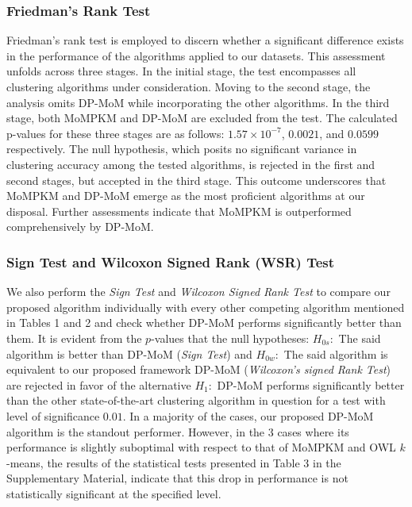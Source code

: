 \documentclass{article}
\begin{document}
\subsubsection{Friedman's Rank Test} 
Friedman's rank test \cite{friedman} is employed to discern whether a significant difference exists in the performance of the algorithms applied to our datasets. This assessment unfolds across three stages. In the initial stage, the test encompasses all clustering algorithms under consideration. Moving to the second stage, the analysis omits DP-MoM while incorporating the other algorithms. In the third stage, both MoMPKM and DP-MoM are excluded from the test. The calculated p-values for these three stages are as follows: $1.57 \times 10^{-7}$, $0.0021$, and $0.0599$ respectively. The null hypothesis, which posits no significant variance in clustering accuracy among the tested algorithms, is rejected in the first and second stages, but accepted in the third stage. This outcome underscores that MoMPKM and DP-MoM emerge as the most proficient algorithms at our disposal. Further assessments indicate that MoMPKM is outperformed comprehensively by DP-MoM. 

\subsubsection{Sign Test and Wilcoxon Signed Rank (WSR) Test}

We also perform the \textit{Sign Test} and \textit{Wilcoxon Signed Rank Test} to compare our proposed algorithm individually with every other competing algorithm mentioned in Tables 1 and 2 and check whether DP-MoM performs significantly better than them. It is evident from the $p$-values that the null hypotheses: $H_{0s}:$ The said algorithm is better than DP-MoM (\textit{Sign Test}) and $H_{0w}:$ The said algorithm is equivalent to our proposed framework DP-MoM (\textit{Wilcoxon's signed Rank Test}) are rejected in favor of the alternative $H_1:$ DP-MoM performs significantly better than the other state-of-the-art clustering algorithm in question for a test with level of significance $0.01$. In a majority of the cases, our proposed DP-MoM algorithm is the standout performer. However, in the 3 cases where its performance is slightly suboptimal with respect to that of MoMPKM and OWL $k$-means, the results of the statistical tests presented in Table 3 in the Supplementary Material, indicate that this drop in performance is not statistically significant at the specified level.
\end{document}
